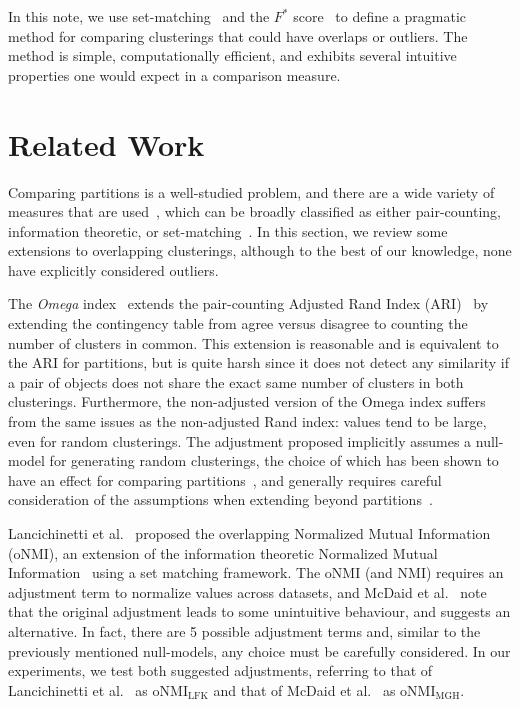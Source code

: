 \documentclass[11pt]{article}
\theoremstyle{remark}
\begin{document}
In this note, we use set-matching~\cite{setmatching} and the $F^*$ score~\cite{F*} to define a pragmatic method for comparing clusterings that could have overlaps or outliers.
The method is simple, computationally efficient, and exhibits several intuitive properties one would expect in a comparison measure.

\section{Related Work}\label{sec:related}
Comparing partitions is a well-studied problem, and there are a wide variety of measures that are used~\cite{comparisonreview}, which can be broadly classified as either pair-counting, information theoretic, or set-matching~\cite{setmatching}.
In this section, we review some extensions to overlapping clusterings, although to the best of our knowledge, none have explicitly considered outliers.

The \textit{Omega} index~\cite{omega} extends the pair-counting Adjusted Rand Index (ARI)~\cite{ari} by extending the contingency table from agree versus disagree to counting the number of clusters in common.
This extension is reasonable and is equivalent to the ARI for partitions, but is quite harsh since it does not detect any similarity if a pair of objects does not share the exact same number of clusters in both clusterings.
Furthermore, the non-adjusted version of the Omega index suffers from the same issues as the non-adjusted Rand index: values tend to be large, even for random clusterings.
The adjustment proposed implicitly assumes a null-model for generating random clusterings, the choice of which has been shown to have an effect for comparing partitions~\cite{partition_models}, and generally requires careful consideration of the assumptions when extending beyond partitions~\cite{fuzzy_models}.

Lancichinetti et al.~\cite{onmi} proposed the overlapping Normalized Mutual Information (oNMI), an extension of the information theoretic Normalized Mutual Information~\cite{ami} using a set matching framework.
The oNMI (and NMI) requires an adjustment term to normalize values across datasets, and McDaid et al.~\cite{onmi2} note that the original adjustment leads to some unintuitive behaviour, and suggests an alternative.
In fact, there are 5 possible adjustment terms and, similar to the previously mentioned null-models, any choice must be carefully considered.
In our experiments, we test both suggested adjustments, referring to that of Lancichinetti et al.~\cite{onmi} as $\mathrm{oNMI_{LFK}}$ and that of McDaid et al.~\cite{onmi2} as $\mathrm{oNMI_{MGH}}$.
\end{document}
